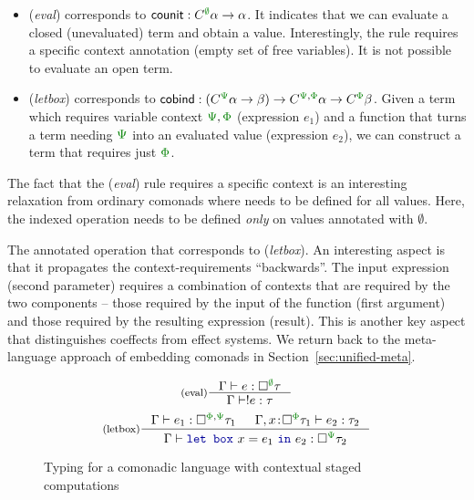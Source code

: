 \begin{itemize}
\item (\emph{eval}) corresponds to $\ident{counit} : \ctyp{\cclrd{\emptyset}}{\alpha} \rightarrow \alpha$. 
  It indicates that we can evaluate a closed (unevaluated) term and obtain a value. Interestingly, the 
  rule requires a specific context annotation (empty set of free variables). 
  It is not possible to evaluate an open term.

\item (\emph{letbox}) corresponds to $\ident{cobind} : (\ctyp{\cclrd{\Psi}}{\alpha} \rightarrow \beta) 
  \rightarrow \ctyp{\cclrd{\Psi}, \cclrd{\Phi}}{\alpha} \rightarrow \ctyp{\cclrd{\Phi}}{\beta}$. 
  Given a term which requires variable context $\cclrd{\Psi}, \cclrd{\Phi}$ 
  (expression $e_1$) and a function that turns a term needing $\cclrd{\Psi}$ into an evaluated 
  value (expression $e_2$), we can construct a term that requires just $\cclrd{\Phi}$.
\end{itemize}

\noindent
The fact that the (\emph{eval}) rule requires a specific context is an interesting relaxation
from ordinary comonads where  needs to be defined for all values. Here, the indexed
 operation needs to be defined \emph{only} on values annotated with $\emptyset$.

The annotated  operation that corresponds to (\emph{letbox}). An interesting aspect 
is that it propagates the context-requirements ``backwards''. The input expression (second parameter) 
requires a combination of contexts that are required by the two components -- those required by the 
input of the function (first argument) and those required by the resulting expression (result). 
This is another key aspect that distinguishes coeffects from effect systems. We return back to 
the meta-language approach of embedding comonads in Section~\ref{sec:unified-meta}.


\begin{figure}
\begin{equation*}
\inference[(eval)]
  {\Gamma \vdash e : \square^{\cclrd{\emptyset}}{\tau}}
  {\Gamma \vdash !e : \tau}
\end{equation*}
\begin{equation*}
\inference[(letbox)]
  { \Gamma \vdash e_1 : \square^{\cclrd{\Phi}, \cclrd{\Psi}}{\tau_1} & 
    \Gamma, x\!:\!\square^{\cclrd{\Phi}}{\tau_1} \vdash e_2 : \tau_2 }
  { \Gamma \vdash \kvd{let~box}~x=e_1~\kvd{in}~e_2 : \square^{\cclrd{\Psi}}{\tau_2}}
\end{equation*}

\caption{Typing for a comonadic language with contextual staged computations}
\label{fig:modal-meta}
\end{figure}

